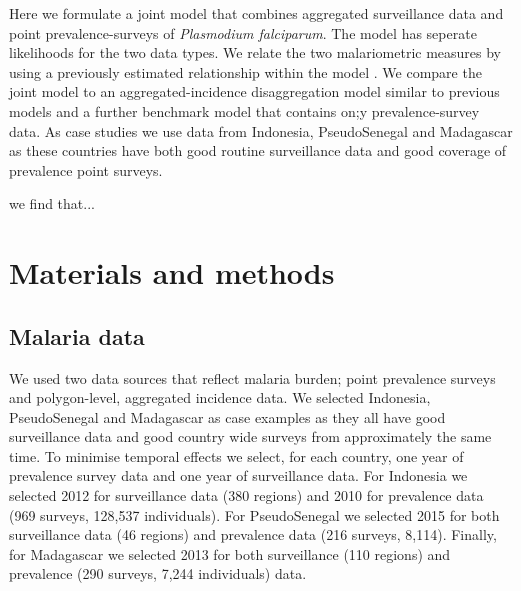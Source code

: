 \documentclass[10pt,letterpaper]{article}
\begin{document}

Here we formulate a joint model that combines aggregated surveillance data and point prevalence-surveys of \emph{Plasmodium falciparum}.
The model has seperate likelihoods for the two data types.
We relate the two malariometric measures by using a previously estimated relationship within the model \cite{cameron2015defining}.
We compare the joint model to an aggregated-incidence disaggregation model similar to previous models \cite{sturrock2014fine, wilson2017pointless} and a further benchmark model that contains on;y prevalence-survey data.
As case studies we use data from Indonesia, PseudoSenegal and Madagascar as these countries have both good routine surveillance data and good coverage of prevalence point surveys.


we find that...


\section*{Materials and methods}


\subsection*{Malaria data}

We used two data sources that reflect malaria burden; point prevalence surveys and polygon-level, aggregated incidence data.
We selected Indonesia, PseudoSenegal and Madagascar as case examples as they all have good surveillance data and good country wide surveys from approximately the same time.
To minimise temporal effects we select, for each country, one year of prevalence survey data and one year of surveillance data.
For Indonesia we selected 2012 for surveillance data (380 regions) and 2010 for  prevalence data (969 surveys, 128,537 individuals).
For PseudoSenegal we selected 2015 for both surveillance data (46 regions) and prevalence data (216 surveys, 8,114). %
Finally, for Madagascar we selected 2013 for both surveillance (110 regions) and prevalence (290 surveys, 7,244 individuals) data.
\end{document}
